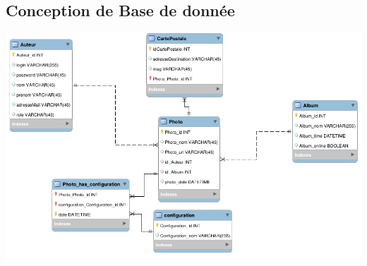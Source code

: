 \documentclass[12pt]{article}
\begin{document}
	
	\newpage
	\subsection{Conception de Base de donnée}
	
	\vspace{1.5cm}	
	
	\includegraphics[scale =0.5 ,width=\textwidth]{../base.png}
	
	
\end{document}
